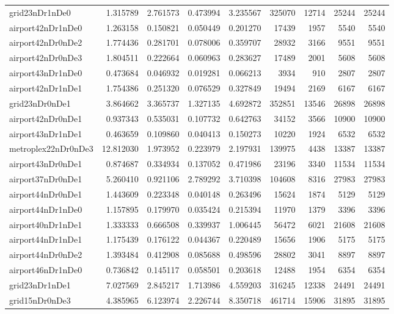 \begin{longtable}{|l|r|r|r|r|r|r|r|r|}
grid23nDr1nDe0 & 1.315789 & 2.761573 & 0.473994 & 3.235567 & 325070 & 12714 & 25244 & 25244 \\
airport42nDr1nDe0 & 1.263158 & 0.150821 & 0.050449 & 0.201270 & 17439 & 1957 & 5540 & 5540 \\
airport42nDr0nDe2 & 1.774436 & 0.281701 & 0.078006 & 0.359707 & 28932 & 3166 & 9551 & 9551 \\
airport42nDr0nDe3 & 1.804511 & 0.222664 & 0.060963 & 0.283627 & 17489 & 2001 & 5608 & 5608 \\
airport43nDr1nDe0 & 0.473684 & 0.046932 & 0.019281 & 0.066213 & 3934 & 910 & 2807 & 2807 \\
airport42nDr1nDe1 & 1.754386 & 0.251320 & 0.076529 & 0.327849 & 19494 & 2169 & 6167 & 6167 \\
grid23nDr0nDe1 & 3.864662 & 3.365737 & 1.327135 & 4.692872 & 352851 & 13546 & 26898 & 26898 \\
airport42nDr0nDe1 & 0.937343 & 0.535031 & 0.107732 & 0.642763 & 34152 & 3566 & 10900 & 10900 \\
airport43nDr1nDe1 & 0.463659 & 0.109860 & 0.040413 & 0.150273 & 10220 & 1924 & 6532 & 6532 \\
metroplex22nDr0nDe3 & 12.812030 & 1.973952 & 0.223979 & 2.197931 & 139975 & 4438 & 13387 & 13387 \\
airport43nDr0nDe1 & 0.874687 & 0.334934 & 0.137052 & 0.471986 & 23196 & 3340 & 11534 & 11534 \\
airport37nDr0nDe1 & 5.260410 & 0.921106 & 2.789292 & 3.710398 & 104608 & 8316 & 27983 & 27983 \\
airport44nDr0nDe1 & 1.443609 & 0.223348 & 0.040148 & 0.263496 & 15624 & 1874 & 5129 & 5129 \\
airport44nDr1nDe0 & 1.157895 & 0.179970 & 0.035424 & 0.215394 & 11970 & 1379 & 3396 & 3396 \\
airport40nDr1nDe1 & 1.333333 & 0.666508 & 0.339937 & 1.006445 & 56472 & 6021 & 21608 & 21608 \\
airport44nDr1nDe1 & 1.175439 & 0.176122 & 0.044367 & 0.220489 & 15656 & 1906 & 5175 & 5175 \\
airport44nDr0nDe2 & 1.393484 & 0.412908 & 0.085688 & 0.498596 & 28802 & 3041 & 8897 & 8897 \\
airport46nDr1nDe0 & 0.736842 & 0.145117 & 0.058501 & 0.203618 & 12488 & 1954 & 6354 & 6354 \\
grid23nDr1nDe1 & 7.027569 & 2.845217 & 1.713986 & 4.559203 & 316245 & 12338 & 24491 & 24491 \\
grid15nDr0nDe3 & 4.385965 & 6.123974 & 2.226744 & 8.350718 & 461714 & 15906 & 31895 & 31895 \\

\end{longtable}
